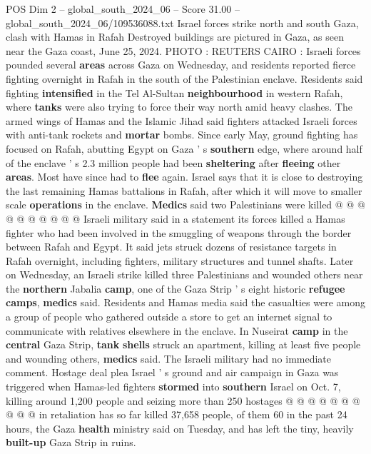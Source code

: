 \begin{textsample}{POS Dim 2 – global\_south\_2024\_06 – Score 31.00 – global\_south\_2024\_06/109536088.txt}  \label{ex:f2_pos_052}
Israel forces strike north and south Gaza, clash with Hamas in Rafah Destroyed buildings are pictured in Gaza, as seen near the Gaza coast, June 25, 2024.
PHOTO : REUTERS CAIRO : Israeli forces pounded several \textbf{areas} across Gaza on Wednesday, and residents reported fierce fighting overnight in Rafah in the south of the Palestinian enclave.
Residents said fighting \textbf{intensified} in the Tel Al-Sultan \textbf{neighbourhood} in western Rafah, where \textbf{tanks} were also trying to force their way north amid heavy clashes.
The armed wings of Hamas and the Islamic Jihad said fighters attacked Israeli forces with anti-tank rockets and \textbf{mortar} bombs.
Since early May, ground fighting has focused on Rafah, abutting Egypt on Gaza ' s \textbf{southern} edge, where around half of the enclave ' s 2.3 million people had been \textbf{sheltering} after \textbf{fleeing} other \textbf{areas}.
Most have since had to \textbf{flee} again.
Israel says that it is close to destroying the last remaining Hamas battalions in Rafah, after which it will move to smaller scale \textbf{operations} in the enclave. \textbf{Medics} said two Palestinians were killed @ @ @ @ @ @ @ @ @ @ Israeli military said in a statement its forces killed a Hamas fighter who had been involved in the smuggling of weapons through the border between Rafah and Egypt.
It said jets struck dozens of resistance targets in Rafah overnight, including fighters, military structures and tunnel shafts.
Later on Wednesday, an Israeli strike killed three Palestinians and wounded others near the \textbf{northern} Jabalia \textbf{camp}, one of the Gaza Strip ' s eight historic \textbf{refugee} \textbf{camps}, \textbf{medics} said.
Residents and Hamas media said the casualties were among a group of people who gathered outside a store to get an internet signal to communicate with relatives elsewhere in the enclave.
In Nuseirat \textbf{camp} in the \textbf{central} Gaza Strip, \textbf{tank} \textbf{shells} struck an apartment, killing at least five people and wounding others, \textbf{medics} said.
The Israeli military had no immediate comment.
Hostage deal plea Israel ' s ground and air campaign in Gaza was triggered when Hamas-led fighters \textbf{stormed} into \textbf{southern} Israel on Oct. 7, killing around 1,200 people and seizing more than 250 hostages @ @ @ @ @ @ @ @ @ @ in retaliation has so far killed 37,658 people, of them 60 in the past 24 hours, the Gaza \textbf{health} ministry said on Tuesday, and has left the tiny, heavily \textbf{built-up} Gaza Strip in ruins.

\end{textsample}
